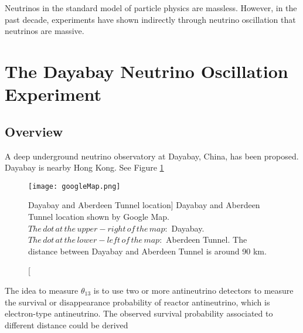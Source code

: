Neutrinos in the standard model of particle physics are massless.
However, in the past decade, experiments have shown indirectly through neutrino oscillation 
that neutrinos are massive.




%
%
%
%
%
%





\section{The Dayabay Neutrino Oscillation Experiment}
\subsection{Overview}

A deep underground neutrino observatory at Dayabay, China, has
been proposed. \cite{TDR}
Dayabay is nearby Hong Kong. See Figure \ref{fig:googleMap.png}


\begin{figure}
    \label{fig:googleMap.png}
    \centering
    \texttt{[image: googleMap.png]}
    \caption
    [Dayabay and Aberdeen Tunnel location]
    {Dayabay and Aberdeen Tunnel location shown by Google Map.
$The\,dot\,at\,the\,upper-right\,of\,the\,map:$ Dayabay.
$The\,dot\,at\,the\,lower-left\,of\,the\,map:$ Aberdeen Tunnel.
The distance between Dayabay and Aberdeen Tunnel is around 90 km.}
    \end{figure}


The idea to measure $\theta_{13}$ is to use two or more antineutrino detectors
to measure the survival or disappearance probability of reactor antineutrino, which is electron-type antineutrino.
The observed survival probability associated to different distance could be derived 


